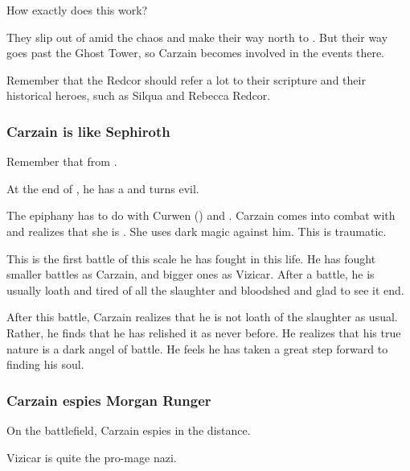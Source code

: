 How exactly does this work?

They slip out of \Forclin{} amid the chaos and make their way north to \Redce{}. 
But their way goes past the Ghost Tower, so Carzain becomes involved in the events there. 

Remember that the Redcor should refer a lot to their scripture and their historical heroes, such as Silqua and Rebecca Redcor. 





\subsubsection{Carzain is like Sephiroth}
Remember that  from \cite{VideoGame:FinalFantasyVII}. 

At the end of \TwilightAngelRememberEmph, he has a  and turns evil. 

The epiphany has to do with Curwen () and \Takestsha.
Carzain comes into combat with \Takestsha and realizes that she is \Nzessuacrith. 
She uses dark magic against him. 
This is traumatic. 

This is the first battle of this scale he has fought in this life.
He has fought smaller battles as Carzain, and bigger ones as Vizicar.
After a battle, he is usually loath and tired of all the slaughter and bloodshed and glad to see it end. 

After this battle, Carzain realizes that he is not loath of the slaughter as usual.
Rather, he finds that he has relished it as never before. 
He realizes that his true nature is a dark angel of battle.
He feels he has taken a great step forward to finding his soul. 





\subsubsection{Carzain espies Morgan Runger}
On the battlefield, Carzain espies  in the distance. 


Vizicar is quite the pro-mage nazi. 







